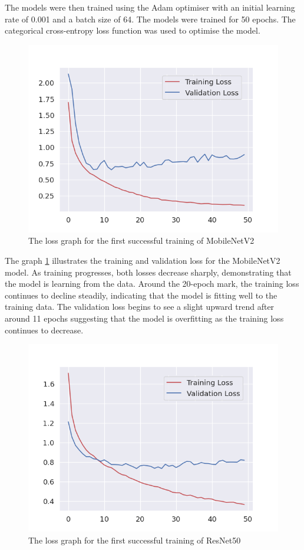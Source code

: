 The models were then trained using the Adam optimiser with an initial learning rate of 0.001 and a batch size of 64. The models were trained for 50 epochs. The categorical cross-entropy loss function was used to optimise the model.

\begin{figure}[H]
    \centering 
    \includegraphics[scale=0.5]{fed_images/train_loss_MobileNetv2.png}
    \caption{The loss graph for the first successful training of MobileNetV2}
    \label{figure:loss_mnv2}
\end{figure}

The graph \ref{figure:loss_mnv2} illustrates the training and validation loss for the MobileNetV2 model. As training progresses, both losses decrease sharply, demonstrating that the model is learning from the data. Around the 20-epoch mark, the training loss continues to decline steadily, indicating that the model is fitting well to the training data. The validation loss begins to see a slight upward trend after around 11 epochs suggesting that the model is overfitting as the training loss continues to decrease.

\begin{figure}[H]
    \centering 
    \includegraphics[scale=0.5]{fed_images/train_loss_ResNet50.png}
    \caption{The loss graph for the first successful training of ResNet50}
    \label{figure:loss_rn50}
\end{figure}

